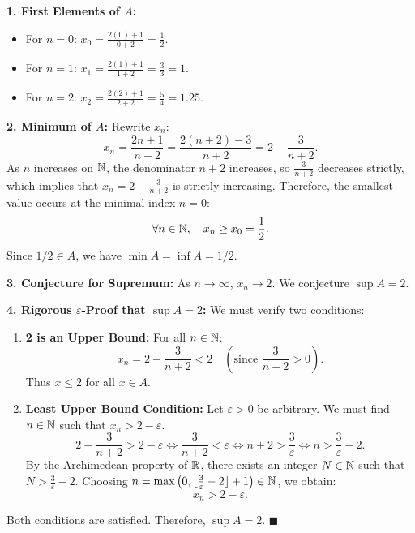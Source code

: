 \begin{solution}
\textbf{1. First Elements of $A$:}
\begin{itemize}[leftmargin=1.5em,itemsep=1pt]
  \item For $n=0$: $x_0 = \frac{2(0)+1}{0+2} = \frac{1}{2}$.
  \item For $n=1$: $x_1 = \frac{2(1)+1}{1+2} = \frac{3}{3} = 1$.
  \item For $n=2$: $x_2 = \frac{2(2)+1}{2+2} = \frac{5}{4} = 1.25$.
\end{itemize}

\textbf{2. Minimum of $A$:}
Rewrite $x_n$:
\[
x_n = \frac{2n + 1}{n + 2} = \frac{2(n + 2) - 3}{n + 2} = 2 - \frac{3}{n + 2}.
\]
As $n$ increases on $\mathbb{N}$, the denominator $n+2$ increases, so $\frac{3}{n+2}$ decreases strictly, which implies that $x_n = 2 - \frac{3}{n+2}$ is strictly increasing.
Therefore, the smallest value occurs at the minimal index $n = 0$:
\[
\forall n \in \mathbb{N}, \quad x_n \ge x_0 = \frac{1}{2}.
\]
Since $1/2 \in A$, we have $\min A = \inf A = 1/2$.

\textbf{3. Conjecture for Supremum:}
As $n \to \infty$, $x_n \to 2$. We conjecture $\sup A = 2$.

\textbf{4. Rigorous $\varepsilon$-Proof that $\sup A = 2$:}
We must verify two conditions:
\begin{enumerate}[leftmargin=1.5em,itemsep=2pt]
  \item \textbf{2 is an Upper Bound:}
  For all $n \in \mathbb{N}$:
  \[
  x_n = 2 - \frac{3}{n + 2} < 2 \quad \left(\text{since } \frac{3}{n+2} > 0\right).
  \]
  Thus $x \le 2$ for all $x \in A$.
  \item \textbf{Least Upper Bound Condition:}
  Let $\varepsilon > 0$ be arbitrary. We must find $n \in \mathbb{N}$ such that $x_n > 2 - \varepsilon$.
  \[
  2 - \frac{3}{n + 2} > 2 - \varepsilon \iff \frac{3}{n + 2} < \varepsilon \iff n + 2 > \frac{3}{\varepsilon} \iff n > \frac{3}{\varepsilon} - 2.
  \]
  By the Archimedean property of $\mathbb{R}$, there exists an integer $N \in \mathbb{N}$ such that $N > \frac{3}{\varepsilon} - 2$.
  Choosing $n = \max\left(0, \lfloor \frac{3}{\varepsilon} - 2 \rfloor + 1\right) \in \mathbb{N}$, we obtain:
  \[
  x_n > 2 - \varepsilon.
  \]
\end{enumerate}
Both conditions are satisfied. Therefore, $\sup A = 2$. \hfill $\blacksquare$
\end{solution}

